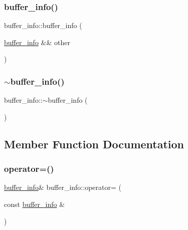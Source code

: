 \mbox{\label{structbuffer__info_a6ea2c0767021b4dc20c6116b6989c3aa}} 
\subsubsection{\texorpdfstring{buffer\_info()}{buffer\_info()}\hspace{0.1cm}{\footnotesize\ttfamily [8/8]}}
{\footnotesize\ttfamily buffer\+\_\+info\+::buffer\+\_\+info (\begin{DoxyParamCaption}\item[{\mbox{\hyperlink{structbuffer__info}{buffer\+\_\+info}} \&\&}]{other }\end{DoxyParamCaption})\hspace{0.3cm}{\ttfamily [inline]}}

\mbox{\label{structbuffer__info_af1f9a46bb7b88c2ff00001b68d21cded}} 
\subsubsection{\texorpdfstring{$\sim$buffer\_info()}{~buffer\_info()}}
{\footnotesize\ttfamily buffer\+\_\+info\+::$\sim$buffer\+\_\+info (\begin{DoxyParamCaption}{ }\end{DoxyParamCaption})\hspace{0.3cm}{\ttfamily [inline]}}



\subsection{Member Function Documentation}
\mbox{\label{structbuffer__info_ab55caff9667d44d8ffec6822c4a09068}} 
\subsubsection{\texorpdfstring{operator=()}{operator=()}\hspace{0.1cm}{\footnotesize\ttfamily [1/2]}}
{\footnotesize\ttfamily \mbox{\hyperlink{structbuffer__info}{buffer\+\_\+info}}\& buffer\+\_\+info\+::operator= (\begin{DoxyParamCaption}\item[{const \mbox{\hyperlink{structbuffer__info}{buffer\+\_\+info}} \&}]{ }\end{DoxyParamCaption})\hspace{0.3cm}{\ttfamily [delete]}}

